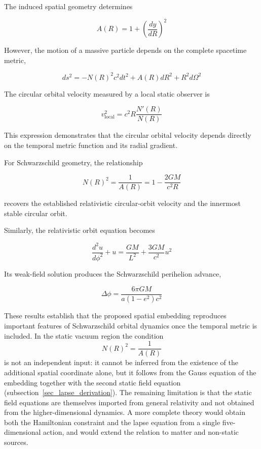 \documentclass[pdflatex,sn-mathphys-num]{sn-jnl}%
\theoremstyle{thmstyleone}%
\theoremstyle{thmstyletwo}%
\theoremstyle{thmstylethree}%
\begin{document}
The induced spatial geometry determines

\begin{equation}
    A(R)
    =
    1+
    \left(\frac{dy}{dR}\right)^2
\end{equation}

However, the motion of a massive particle depends on the complete spacetime metric,

\begin{equation}
    ds^2
    =
    -N(R)^2c^2dt^2
    +
    A(R)dR^2
    +
    R^2d\Omega^2
\end{equation}

The circular orbital velocity measured by a local static observer is

\begin{equation}
    v_{\mathrm{local}}^2
    =
    c^2R\frac{N'(R)}{N(R)}
\end{equation}

This expression demonstrates that the circular orbital velocity depends directly on the temporal metric function and its radial gradient.

For Schwarzschild geometry, the relationship

\begin{equation}
    N(R)^2
    =
    \frac{1}{A(R)}
    =
    1-\frac{2GM}{c^2R}
\end{equation}

recovers the established relativistic circular-orbit velocity and the innermost stable circular orbit.

Similarly, the relativistic orbit equation becomes

\begin{equation}
    \frac{d^2u}{d\phi^2}+u
    =
    \frac{GM}{L^2}
    +
    \frac{3GM}{c^2}u^2
\end{equation}

Its weak-field solution produces the Schwarzschild perihelion advance,

\begin{equation}
    \Delta\phi
    =
    \frac{6\pi GM}
    {a(1-e^2)c^2}
\end{equation}

These results establish that the proposed spatial embedding reproduces important features of Schwarzschild orbital dynamics once the temporal metric is included. In the static vacuum region the condition
\begin{equation}
N(R)^2=\frac{1}{A(R)}
\end{equation}
is not an independent input: it cannot be inferred from the existence of the additional spatial coordinate alone, but it follows from the Gauss equation of the embedding together with the second static field equation (subsection~\ref{sec_lapse_derivation}). The remaining limitation is that the static field equations are themselves imported from general relativity and not obtained from the higher-dimensional dynamics. A more complete theory would obtain both the Hamiltonian constraint and the lapse equation from a single five-dimensional action, and would extend the relation to matter and non-static sources.
\end{document}
